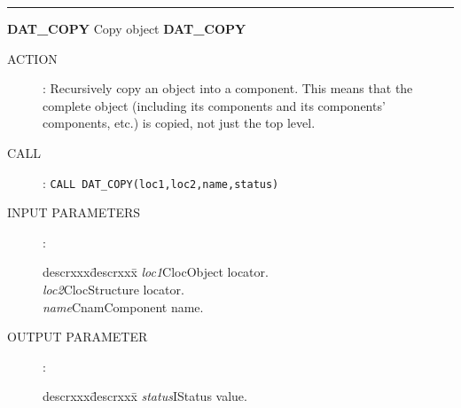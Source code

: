 \goodbreak
\rule{\textwidth}{0.3mm}
{\Large {\bf DAT\_COPY} \hfill Copy object \hfill {\bf DAT\_COPY}}
\begin{description}
\item [ACTION]:
Recursively copy an object into a component. This means that the complete
object (including its components and its components' components, etc.)
is
copied, not just the top level.
\item [CALL]:
{\tt CALL DAT\_COPY(loc1,loc2,name,status)}
\item [INPUT PARAMETERS]:
\begin{tabbing}
descrxxx\=descrxxx\=\kill
{\em loc1}\>Cloc\>Object locator.\\
{\em loc2}\>Cloc\>Structure locator.\\
{\em name}\>Cnam\>Component name.
\end{tabbing}
\item [OUTPUT PARAMETER]:
\begin{tabbing}
descrxxx\=descrxxx\=\kill
{\em status}\>I\>Status value.
\end{tabbing}
\end{description}
\goodbreak

